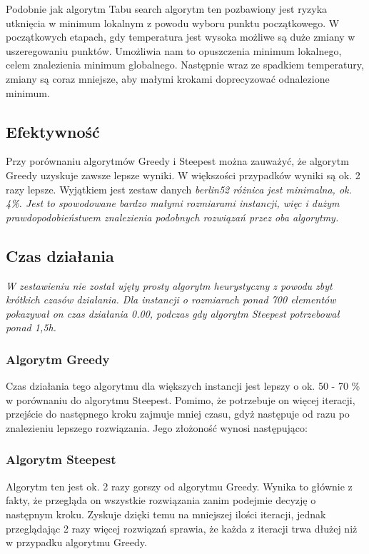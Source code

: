 Podobnie jak algorytm Tabu search algorytm ten pozbawiony jest ryzyka utknięcia w minimum 
lokalnym z powodu wyboru punktu początkowego. W początkowych etapach, gdy temperatura jest 
wysoka możliwe są duże zmiany w uszeregowaniu punktów. Umożliwia nam to opuszczenia minimum
lokalnego, celem znalezienia minimum globalnego. Następnie wraz ze spadkiem temperatury, zmiany 
są coraz mniejsze, aby małymi krokami doprecyzować odnalezione minimum.

\subsection{Efektywność}

Przy porównaniu algorytmów Greedy i Steepest można zauważyć, że algorytm Greedy uzyskuje 
zawsze lepsze wyniki. W większości przypadków wyniki są ok. 2 razy lepsze. Wyjątkiem jest 
zestaw danych \it berlin52 \rm różnica jest minimalna, ok. 4\%. Jest to spowodowane 
bardzo małymi rozmiarami instancji, więc i dużym prawdopodobieństwem znalezienia podobnych
rozwiązań przez oba algorytmy.

\subsection{Czas działania}

\it
W zestawieniu nie został ujęty prosty algorytm heurystyczny z powodu zbyt krótkich czasów 
działania. Dla instancji o rozmiarach ponad 700 elementów pokazywał on czas działania 0.00, 
podczas gdy algorytm Steepest potrzebował ponad 1,5h.
\rm

\subsubsection{Algorytm Greedy}

Czas działania tego algorytmu dla większych instancji jest lepszy o ok. 50 - 70 \% w porównaniu 
do algorytmu Steepest. Pomimo, że potrzebuje on więcej iteracji, przejście do następnego kroku 
zajmuje mniej czasu, gdyż następuje od razu po znalezieniu lepszego rozwiązania. Jego złożoność 
wynosi następująco:

\subsubsection{Algorytm Steepest}

Algorytm ten jest ok. 2 razy gorszy od algorytmu Greedy. Wynika to głównie z fakty, że przegląda on
wszystkie rozwiązania zanim podejmie decyzję o następnym kroku. Zyskuje dzięki temu na mniejszej
ilości iteracji, jednak przeglądając 2 razy więcej rozwiązań sprawia, że każda z iteracji trwa 
dłużej niż w przypadku algorytmu Greedy.

